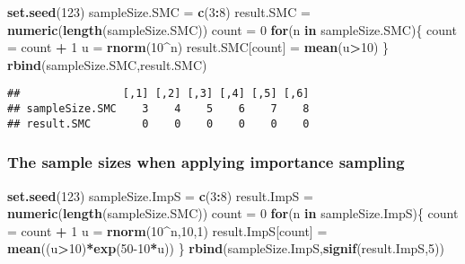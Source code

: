 \documentclass[
]{article}
\newenvironment{Shaded}{\begin{snugshade}}{\end{snugshade}}
\newcommand{\ControlFlowTok}[1]{\textcolor[rgb]{0.13,0.29,0.53}{\textbf{#1}}}
\newcommand{\DecValTok}[1]{\textcolor[rgb]{0.00,0.00,0.81}{#1}}
\newcommand{\FunctionTok}[1]{\textcolor[rgb]{0.13,0.29,0.53}{\textbf{#1}}}
\newcommand{\NormalTok}[1]{#1}
\newcommand{\OtherTok}[1]{\textcolor[rgb]{0.56,0.35,0.01}{#1}}
\newcommand{\SpecialCharTok}[1]{\textcolor[rgb]{0.81,0.36,0.00}{\textbf{#1}}}
\begin{document}
\begin{Shaded}
\begin{Highlighting}[]
\FunctionTok{set.seed}\NormalTok{(}\DecValTok{123}\NormalTok{)}
\NormalTok{sampleSize.SMC }\OtherTok{=} \FunctionTok{c}\NormalTok{(}\DecValTok{3}\SpecialCharTok{:}\DecValTok{8}\NormalTok{)}
\NormalTok{result.SMC }\OtherTok{=} \FunctionTok{numeric}\NormalTok{(}\FunctionTok{length}\NormalTok{(sampleSize.SMC))}
\NormalTok{count }\OtherTok{=} \DecValTok{0}
\ControlFlowTok{for}\NormalTok{(n }\ControlFlowTok{in}\NormalTok{ sampleSize.SMC)\{}
\NormalTok{  count }\OtherTok{=}\NormalTok{ count }\SpecialCharTok{+} \DecValTok{1}
\NormalTok{  u }\OtherTok{=} \FunctionTok{rnorm}\NormalTok{(}\DecValTok{10}\SpecialCharTok{\^{}}\NormalTok{n)}
\NormalTok{  result.SMC[count] }\OtherTok{=} \FunctionTok{mean}\NormalTok{(u}\SpecialCharTok{\textgreater{}}\DecValTok{10}\NormalTok{)}
\NormalTok{\}}
\FunctionTok{rbind}\NormalTok{(sampleSize.SMC,result.SMC)}
\end{Highlighting}
\end{Shaded}

\begin{verbatim}
##                [,1] [,2] [,3] [,4] [,5] [,6]
## sampleSize.SMC    3    4    5    6    7    8
## result.SMC        0    0    0    0    0    0
\end{verbatim}

\hypertarget{the-sample-sizes-when-applying-importance-sampling}{%
\subsubsection{The sample sizes when applying importance
sampling}\label{the-sample-sizes-when-applying-importance-sampling}}

\begin{Shaded}
\begin{Highlighting}[]
\FunctionTok{set.seed}\NormalTok{(}\DecValTok{123}\NormalTok{)}
\NormalTok{sampleSize.ImpS }\OtherTok{=} \FunctionTok{c}\NormalTok{(}\DecValTok{3}\SpecialCharTok{:}\DecValTok{8}\NormalTok{)}
\NormalTok{result.ImpS }\OtherTok{=} \FunctionTok{numeric}\NormalTok{(}\FunctionTok{length}\NormalTok{(sampleSize.SMC))}
\NormalTok{count }\OtherTok{=} \DecValTok{0}
\ControlFlowTok{for}\NormalTok{(n }\ControlFlowTok{in}\NormalTok{ sampleSize.ImpS)\{}
\NormalTok{  count }\OtherTok{=}\NormalTok{ count }\SpecialCharTok{+} \DecValTok{1}
\NormalTok{  u }\OtherTok{=} \FunctionTok{rnorm}\NormalTok{(}\DecValTok{10}\SpecialCharTok{\^{}}\NormalTok{n,}\DecValTok{10}\NormalTok{,}\DecValTok{1}\NormalTok{)}
\NormalTok{  result.ImpS[count] }\OtherTok{=} \FunctionTok{mean}\NormalTok{((u}\SpecialCharTok{\textgreater{}}\DecValTok{10}\NormalTok{)}\SpecialCharTok{*}\FunctionTok{exp}\NormalTok{(}\DecValTok{50{-}10}\SpecialCharTok{*}\NormalTok{u))}
\NormalTok{\}}
\FunctionTok{rbind}\NormalTok{(sampleSize.ImpS,}\FunctionTok{signif}\NormalTok{(result.ImpS,}\DecValTok{5}\NormalTok{))}
\end{Highlighting}
\end{Shaded}
\end{document}
